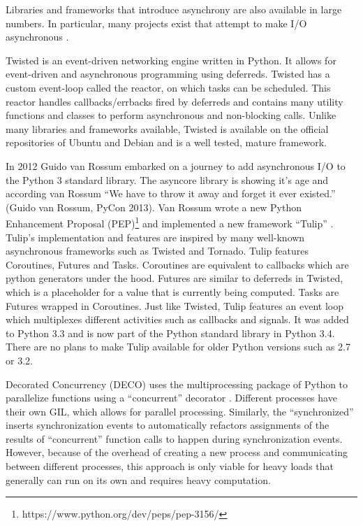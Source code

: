 Libraries and frameworks that introduce asynchrony are also available in large numbers.
In particular, many projects exist that attempt to make I/O asynchronous \cite{asyncio2016python}.

Twisted is an event-driven networking engine written in Python.
It allows for event-driven and asynchronous programming using deferreds.
Twisted has a custom event-loop called the reactor, on which tasks can be scheduled.
This reactor handles callbacks/errbacks fired by deferreds and contains many utility functions and classes to perform asynchronous and non-blocking calls.
Unlike many libraries and frameworks available, Twisted is available on the official repositories of Ubuntu and Debian and is a well tested, mature framework.

In 2012 Guido van Rossum embarked on a journey to add asynchronous I/O to the Python 3 standard library.
The asyncore library is showing it's age and according van Rossum \enquote{We have to throw it away and forget it ever existed.} (Guido van Rossum, PyCon 2013).
Van Rossum wrote a new Python Enhancement Proposal (PEP)\footnote{https://www.python.org/dev/peps/pep-3156/} and implemented a new framework \enquote{Tulip} \cite{edge2013pycon}.
Tulip's implementation and features are inspired by many well-known asynchronous frameworks such as Twisted and Tornado.
Tulip features Coroutines, Futures and Tasks.
Coroutines are equivalent to callbacks which are python generators under the hood.
Futures are similar to deferreds in Twisted, which is a placeholder for a value that is currently being computed.
Tasks are Futures wrapped in Coroutines.
Just like Twisted, Tulip features an event loop which multiplexes different activities such as callbacks and signals. 
It was added to Python 3.3 and is now part of the Python standard library in Python 3.4.
There are no plans to make Tulip available for older Python versions such as 2.7 or 3.2.

Decorated Concurrency (DECO) uses the multiprocessing package of Python to parallelize functions using a ``concurrent'' decorator \cite{sherman2016deco}.
Different processes have their own GIL, which allows for parallel processing.
Similarly, the ``synchronized''  inserts synchronization events to automatically refactors assignments of the results of ``concurrent'' function calls to happen during synchronization events.
However, because of the overhead of creating a new process and communicating between different processes, this approach is only viable for heavy loads that generally can run on its own and requires heavy computation.


